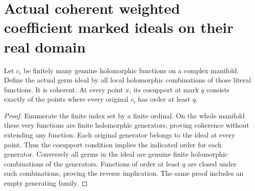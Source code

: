\section{Actual coherent weighted coefficient marked ideals on their real domain}
\label{sec:hironaka-actual-coherent-weighted-coefficient-marked}

\begin{theorem}
\label{hir:actual-finite-function-coherent-ideal}
\leanok
Let $c_i$ be finitely many genuine holomorphic functions on a complex manifold.
Define the actual germ ideal by all local holomorphic combinations of those
literal functions. It is coherent. At every point $x$, its cosupport at mark
$q$ consists exactly of the points where every original $c_i$ has order at
least $q$.
\end{theorem}
\begin{proof}
Enumerate the finite index set by a finite ordinal. On the whole manifold
these very functions are finite holomorphic generators, proving coherence
without extending any function. Each original generator belongs to the
ideal at every point. Thus the cosupport condition implies the indicated
order for each generator. Conversely all germs in the ideal are genuine
finite holomorphic combinations of the generators. Functions of order at
least $q$ are closed under such combinations, proving the reverse implication.
The same proof includes an empty generating family.
\end{proof}

